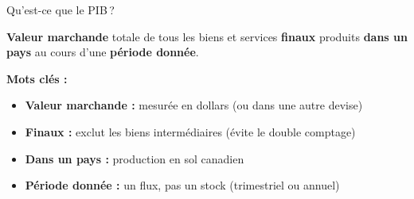 \documentclass[aspectratio=169]{beamer}
\begin{document}
\begin{frame}{Qu'est-ce que le PIB\,?}
   \begin{defbox}
      \textbf{Valeur marchande} totale de tous les biens et services \textbf{finaux} produits \textbf{dans un pays} au cours d'une \textbf{période donnée}.
   \end{defbox}
   \vspace{0.3cm}
   \textbf{Mots clés :}
   \vspace{0.15cm}
   \begin{itemize}
      \setlength\itemsep{0.15cm}
      \item \textbf{Valeur marchande :} mesurée en dollars (ou dans une autre devise)
      \item \textbf{Finaux :} exclut les biens intermédiaires (évite le double comptage)
      \item \textbf{Dans un pays :} production en sol canadien
      \item \textbf{Période donnée :} un flux, pas un stock (trimestriel ou annuel)
   \end{itemize}
\end{frame}
\end{document}
